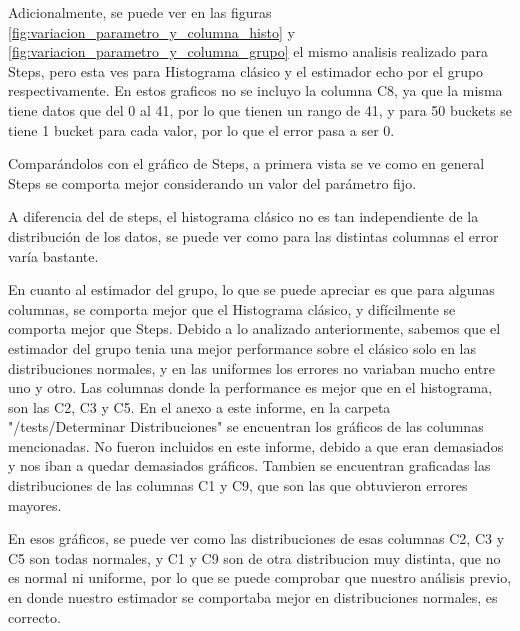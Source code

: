 Adicionalmente, se puede ver en las figuras \ref{fig:variacion_parametro_y_columna_histo} y \ref{fig:variacion_parametro_y_columna_grupo} el mismo analisis realizado para Steps, pero esta ves para Histograma cl\'asico y el estimador echo por el grupo respectivamente. En estos graficos no se incluyo la columna C8, ya que la misma tiene datos que del 0 al 41, por lo que tienen un rango de 41, y para 50 buckets se tiene 1 bucket para cada valor, por lo que el error pasa a ser 0.

	Compar\'andolos con el gr\'afico de Steps, a primera vista se ve como en general Steps se comporta mejor considerando un valor del par\'ametro fijo. 
	
	A diferencia del de steps, el histograma cl\'asico no es tan independiente de la distribuci\'on de los datos, se puede ver como para las distintas columnas el error var\'ia bastante. 
	
	En cuanto al estimador del grupo, lo que se puede apreciar es que para algunas columnas, se comporta mejor que el Histograma cl\'asico, y dif\'icilmente se comporta mejor que Steps. Debido a lo analizado anteriormente, sabemos que el estimador del grupo tenia una mejor performance sobre el cl\'asico solo en las distribuciones normales, y en las uniformes los errores no variaban mucho entre uno y otro. Las columnas donde la performance es mejor que en el histograma, son las C2, C3 y C5. En el anexo a este informe, en la carpeta "/tests/Determinar Distribuciones" se encuentran los gr\'aficos de las columnas mencionadas. No fueron incluidos en este informe, debido a que eran demasiados y nos iban a quedar demasiados gr\'aficos. Tambien se encuentran graficadas las distribuciones de las columnas C1 y C9, que son las que obtuvieron errores mayores.
	
	En esos gr\'aficos, se puede ver como las distribuciones de esas columnas C2, C3 y C5 son todas normales, y C1 y C9 son de otra distribucion muy distinta, que no es normal ni uniforme, por lo que se puede comprobar que nuestro an\'alisis previo, en donde nuestro estimador se comportaba mejor en distribuciones normales, es correcto.
	
